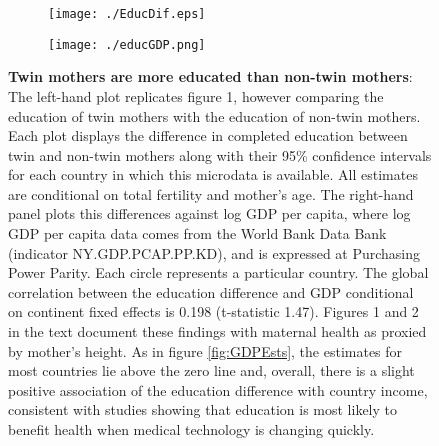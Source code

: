 \documentclass{nature}
\begin{document}
\begin{linenumbers}
\begin{spacing}{1}
\begin{figure}[htpb!]
\begin{subfigure}{.5\textwidth}
  \texttt{[image: ./EducDif.eps]}
\end{subfigure}%
\begin{subfigure}{.5\textwidth}
  \texttt{[image: ./educGDP.png]}
\end{subfigure}%
\vspace{5mm}
\caption{\textbf{Twin mothers are more educated than non-twin mothers}: {\footnotesize The left-hand plot replicates figure 1, however comparing the education of twin mothers with the education of non-twin mothers.  Each plot displays the difference in completed education between twin and non-twin mothers along with their 95\% confidence intervals for each country in which this microdata is available.  All estimates are conditional on total fertility and mother's age.  The right-hand panel plots this differences against log GDP per capita, where log GDP per capita data comes from the World Bank Data Bank (indicator NY.GDP.PCAP.PP.KD), and is expressed at Purchasing Power Parity.  Each circle represents a particular country. The global correlation between the education difference and GDP conditional on continent fixed effects is 0.198 (t-statistic 1.47). Figures 1 and 2 in the text document these findings with maternal health as proxied by mother's height. As in figure \ref{fig:GDPEsts}, the estimates for most countries lie above the zero line and, overall, there is a slight positive association of the education difference with country income, consistent with studies showing that education is most likely to benefit health when medical technology is changing quickly\cite{LlerasMuneyGlied2008}.}}
\end{figure}


\end{spacing}
\end{linenumbers}
\end{document}
